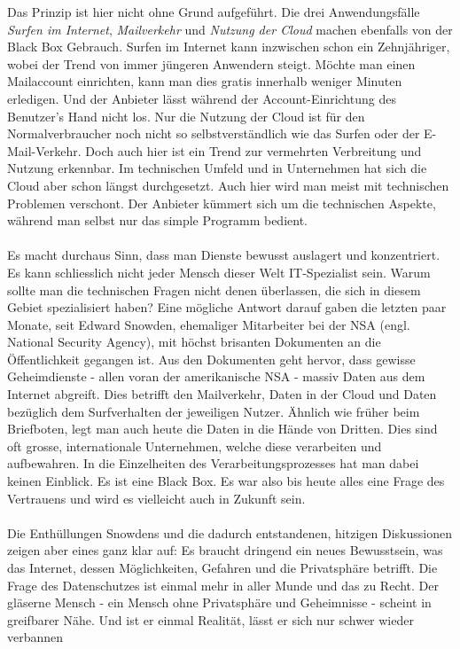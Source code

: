 Das Prinzip ist hier nicht ohne Grund aufgeführt. Die drei Anwendungsfälle \textit{Surfen im Internet}, \textit{Mailverkehr} und \textit{Nutzung der Cloud} machen ebenfalls von der Black Box Gebrauch. Surfen im Internet kann inzwischen schon ein Zehnjähriger, wobei der Trend von immer jüngeren Anwendern steigt. Möchte man einen Mailaccount einrichten, kann man dies gratis innerhalb weniger Minuten erledigen. Und der Anbieter lässt während der Account-Einrichtung des Benutzer's Hand nicht los. Nur die Nutzung der Cloud ist für den Normalverbraucher noch nicht so selbstverständlich wie das Surfen oder der E-Mail-Verkehr. Doch auch hier ist ein Trend zur vermehrten Verbreitung und Nutzung erkennbar. Im technischen Umfeld und in Unternehmen hat sich die Cloud aber schon längst durchgesetzt. Auch hier wird man meist mit technischen Problemen verschont. Der Anbieter kümmert sich um die technischen Aspekte, während man selbst nur das simple Programm bedient.
\\
\\
Es macht durchaus Sinn, dass man Dienste bewusst auslagert und konzentriert. Es kann schliesslich nicht jeder Mensch dieser Welt IT-Spezialist sein. Warum sollte man die technischen Fragen nicht denen überlassen, die sich in diesem Gebiet spezialisiert haben? Eine mögliche Antwort darauf gaben die letzten paar Monate, seit Edward Snowden, ehemaliger Mitarbeiter bei der NSA (engl. National Security Agency), mit höchst brisanten Dokumenten an die Öffentlichkeit gegangen ist. Aus den Dokumenten geht hervor, dass gewisse Geheimdienste - allen voran der amerikanische NSA - massiv Daten aus dem Internet abgreift. Dies betrifft den Mailverkehr, Daten in der Cloud und Daten bezüglich dem Surfverhalten der jeweiligen Nutzer. Ähnlich wie früher beim Briefboten, legt man auch heute die Daten in die Hände von Dritten. Dies sind oft grosse, internationale Unternehmen, welche diese verarbeiten und aufbewahren. In die Einzelheiten des Verarbeitungsprozesses hat man dabei keinen Einblick. Es ist eine Black Box. Es war also bis heute alles eine Frage des Vertrauens und wird es vielleicht auch in Zukunft sein.
\\
\\
Die Enthüllungen Snowdens und die dadurch entstandenen, hitzigen Diskussionen zeigen aber eines ganz klar auf: Es braucht dringend ein neues Bewusstsein, was das Internet, dessen Möglichkeiten,  Gefahren und die Privatsphäre betrifft. Die Frage des Datenschutzes ist einmal mehr in aller Munde und das zu Recht. Der gläserne Mensch - ein Mensch ohne Privatsphäre und Geheimnisse - scheint in greifbarer Nähe. Und ist er einmal Realität, lässt er sich nur schwer wieder verbannen

